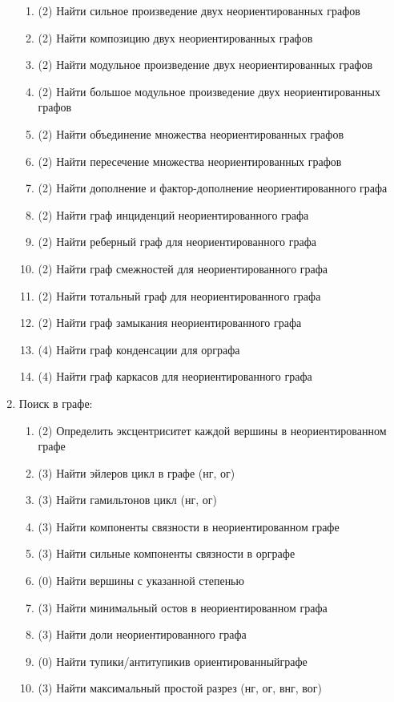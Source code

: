 \begin{enumerate}
\begin{enumerate}[1.]
  \item (2) Найти сильное произведение двух неориентированных графов 
  \item (2) Найти композицию двух неориентированных графов 
  \item (2) Найти модульное произведение двух неориентированных графов 
  \item (2) Найти большое модульное произведение двух неориентированных графов 
  \item (2) Найти объединение множества неориентированных графов 
  \item (2) Найти пересечение множества неориентированных графов 
  \item (2) Найти дополнение и фактор-дополнение неориентированного графа 
  \item (2) Найти граф инциденций неориентированного графа 
  \item (2) Найти реберный граф для неориентированного графа 
  \item (2) Найти граф смежностей для неориентированного графа 
  \item (2) Найти тотальный граф для неориентированного графа 
  \item (2) Найти граф замыкания неориентированного графа  
  \item (4) Найти граф конденсации для орграфа 
  \item (4) Найти граф каркасов для неориентированного графа 
  \end{enumerate}
\item Поиск в графе:
  \begin{enumerate}[1.]
  \item (2) Определить эксцентриситет каждой вершины в неориентированном графе 
  \item (3) Найти эйлеров цикл в графе (нг, ог)
  \item (3) Найти гамильтонов цикл (нг, ог)
  \item (3) Найти компоненты связности в неориентированном графе 
  \item (3) Найти сильные компоненты связности в орграфе  
  \item (0) Найти вершины с указанной степенью 
  \item (3) Найти минимальный остов в неориентированном графа  
  \item (3) Найти доли неориентированного графа  
  \item (0) Найти тупики/антитупикив ориентированныйграфе 
  \item (3) Найти максимальный простой разрез (нг, ог, внг, вог)

\end{enumerate}
\end{enumerate}

